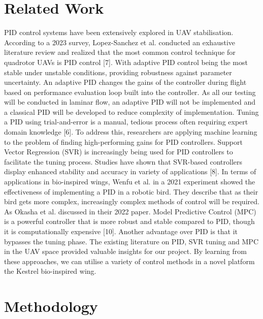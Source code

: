 \section{Related Work}
    PID control systems have been extensively explored in UAV
    stabilisation. According to a 2023 survey, Lopez-Sanchez et al.
    conducted an exhaustive literature review and realized that the most
    common control technique for quadrotor UAVs is PID control [7]. With
    adaptive PID control being the most stable under unstable conditions,
    providing robustness against parameter uncertainty. An adaptive PID
    changes the gains of the controller during flight based on performance
    evaluation loop built into the controller. As all our testing will be
    conducted in laminar flow, an adaptive PID will not be implemented and a
    classical PID will be developed to reduce complexity of implementation.
    \vspace{\baselineskip}
    Tuning a PID using trial-and-error is a manual, tedious process often
    requiring expert domain knowledge [6]. To address this, researchers are
    applying machine learning to the problem of finding high-performing gains
    for PID controllers. Support Vector Regression (SVR) is increasingly being
    used for PID controllers to facilitate the tuning process. Studies have
    shown that SVR-based controllers display enhanced stability and accuracy
    in variety of applications [8].
    \vspace{\baselineskip}
    In terms of applications in bio-inspired wings, Wenfu et al. in a 2021
    experiment showed the effectiveness of implementing a PID in a robotic
    bird. They describe that as their bird gets more complex, increasingly
    complex methods of control will be required. 
    \vspace{\baselineskip}
    As Okasha et al. discussed in their 2022 paper. Model Predictive Control
    (MPC) is a powerful controller that is more robust and stable compared
    to PID, though it is computationally expensive [10]. Another advantage
    over PID is that it bypasses the tuning phase.
    \vspace{\baselineskip}
    The existing literature on PID, SVR tuning and MPC in the UAV space
    provided valuable insights for our project. By learning from these
    approaches, we can utilise a variety of control methods in a novel
    platform the Kestrel bio-inspired wing.

\section{Methodology}
